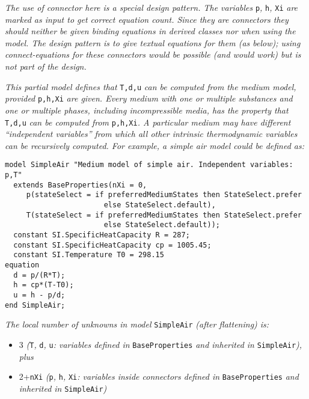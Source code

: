 \emph{The use of connector here is a special design pattern. The
variables} \lstinline!p!\emph{,} \lstinline!h!\emph{,} \lstinline!Xi! \emph{are marked as input to get
correct equation count. Since they are connectors they should neither be
given binding equations in derived classes nor when using the model. The
design pattern is to give textual equations for them (as below); using
connect-equations for these connectors would be possible (and would
work) but is not part of the design.}

\emph{This partial model defines that} \lstinline!T,d,u! \emph{can be computed from
the medium model, provided} \lstinline!p,h,Xi! \emph{are given. Every medium with
one or multiple substances and one or multiple phases, including
incompressible media, has the property that} \lstinline!T,d,u! \emph{can be computed
from} \lstinline!p,h,Xi!\emph{. A particular medium may have different ``independent
variables'' from which all other intrinsic thermodynamic variables can
be recursively computed. For example, a simple air model could be
defined as:}

\begin{lstlisting}[language=modelica]
model SimpleAir "Medium model of simple air. Independent variables: p,T"
  extends BaseProperties(nXi = 0,
     p(stateSelect = if preferredMediumStates then StateSelect.prefer
                       else StateSelect.default),
     T(stateSelect = if preferredMediumStates then StateSelect.prefer
                       else StateSelect.default));
  constant SI.SpecificHeatCapacity R = 287;
  constant SI.SpecificHeatCapacity cp = 1005.45;
  constant SI.Temperature T0 = 298.15
equation
  d = p/(R*T);
  h = cp*(T-T0);
  u = h - p/d;
end SimpleAir;
\end{lstlisting}

\emph{The local number of unknowns in model} \lstinline!SimpleAir! \emph{(after
flattening) is:}

\begin{itemize}
\item
  3 \emph{(}\lstinline!T!\emph{,} \lstinline!d!\emph{,} \lstinline!u!\emph{: variables defined in}
  \lstinline!BaseProperties! \emph{and inherited in} \lstinline!SimpleAir!\emph{), plus}
\item
  2+\lstinline!nXi! \emph{(}\lstinline!p!\emph{,} \lstinline!h!\emph{,} 
	\lstinline!Xi!\emph{: variables inside
  connectors defined in} \lstinline!BaseProperties! \emph{and inherited in}
  \lstinline!SimpleAir!\emph{)}
\end{itemize}

